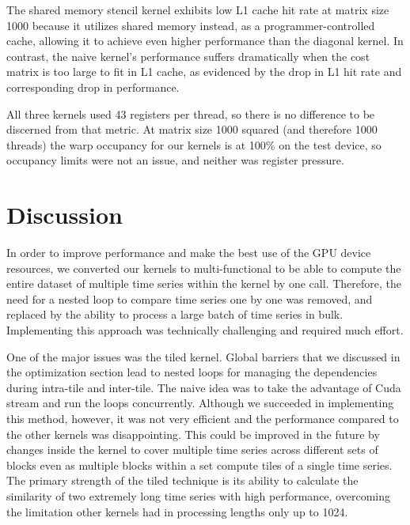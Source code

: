 \documentclass[12pt, letterpaper]{article}
\begin{document}
The shared memory stencil kernel exhibits low L1 cache hit rate at matrix size
1000 because it utilizes shared memory instead, as a programmer-controlled
cache, allowing it to achieve even higher performance than the diagonal
kernel. In contrast, the naive kernel's performance suffers dramatically when
the cost matrix is too large to fit in L1 cache, as evidenced by the drop in L1
hit rate and corresponding drop in performance.

All three kernels used 43 registers per thread, so there is no difference to be
discerned from that metric. At matrix size 1000 squared (and therefore 1000
threads) the warp occupancy for our kernels is at 100\% on the test device, so
occupancy limits were not an issue, and neither was register pressure.





\FloatBarrier
\section{Discussion}

In order to improve performance and make the best use of the GPU device
resources, we converted our kernels to multi-functional to be able to compute
the entire dataset of multiple time series within the kernel by one call.
Therefore, the need for a nested loop to compare time series one by one was
removed, and replaced by the ability to process a large batch of time series in
bulk. Implementing this approach was technically challenging and required much
effort.

One of the major issues was the tiled kernel. Global barriers that we discussed
in the optimization section lead to nested loops for managing the dependencies
during intra-tile and inter-tile. The naive idea was to take the advantage of
Cuda stream and run the loops concurrently. Although we succeeded in
implementing this method, however, it was not very efficient and the performance
compared to the other kernels was disappointing. This could be improved in the
future by changes inside the kernel to cover multiple time series across
different sets of blocks even as multiple blocks within a set compute tiles of a
single time series. The primary strength of the tiled technique is its ability
to calculate the similarity of two extremely long time series with high
performance, overcoming the limitation other kernels had in processing lengths
only up to 1024.
\end{document}
